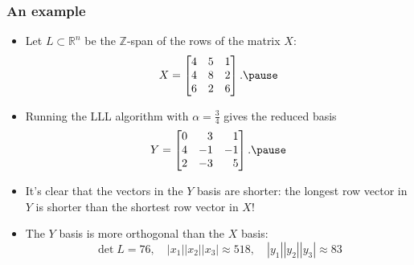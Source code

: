 \documentclass{beamer}
\newcommand{\integers}{\mathbb{Z}}
\newcommand{\reals}{\mathbb{R}}
\begin{document}
\begin{frame}
	\frametitle{An example}
	\begin{itemize}
		\item Let $L\subset \reals^n$ be the $\integers$-span of the rows of the matrix $X$:
		\[
		X = \begin{bmatrix*}[r]
			4 & 5 & 1\\
			4 & 8 & 2\\
			6 & 2 & 6
		\end{bmatrix*}.\pause
		\]
		\item Running the LLL algorithm with $\alpha = \frac{3}{4}$ gives the reduced basis
		\[
		Y = \begin{bmatrix*}[r]
			0 & 3 & 1\\
			4 & -1 & -1\\
			2 & -3 & 5
		\end{bmatrix*}.\pause
		\]
		\item It's clear that the vectors in the $Y$ basis are shorter: the longest row vector in $Y$ is shorter than the shortest row vector in $X$!\pause
		\item The $Y$ basis is more orthogonal than the $X$ basis:
		\[
		\det L=  76,\quad |x_1||x_2||x_3| \approx 518,\quad |y_1||y_2||y_3| \approx 83
		\]
	\end{itemize}
\end{frame}

\end{document}
